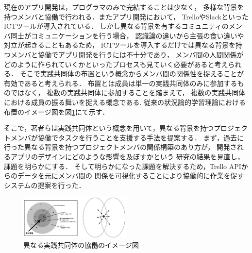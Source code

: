 
現在のアプリ開発は，プログラマのみで完結することは少なく，
多様な背景を持つメンバと協働で行われる．またアプリ開発において，
TrelloやSlackといったICTツールが導入されている．
しかし異なる背景を有するコミュニティのメンバ同士がコミュニケーションを行う場合，
認識論の違いから主張の食い違いや対立が起きることもあるため\cite{conflict}，
ICTツールを導入するだけでは異なる背景を持つメンバと協働でアプリ開発を行うには不十分であり，
メンバ間の人間関係がどのように作られていくかといったプロセスも見ていく必要があると考えられる．
そこで実践共同体\cite{Matsumoto}の布置という概念からメンバ間の関係性を捉えることが有効であると考えられる．
布置とは成員は単一の実践共同体のみに参加するものではなく，
複数の実践共同体に参加することを踏まえて，
複数の実践共同体における成員の振る舞いを捉える概念である.
従来の状況論的学習理論における布置のイメージ図を図\ref{overlap}にて示す．


そこで，著者らは実践共同体という概念を用いて，異なる背景を持つプロジェクトメンバが協働でタスクを行うことを支援する手法を提案する．
まず，過去に行った異なる背景を持つプロジェクトメンバの関係構築のあり方が，
開発されるアプリのデザインにどのような影響を及ぼすかという
研究の結果を見直し，課題を明らかにする．
そして明らかになった課題を解決するため，Trello APIからのデータを元にメンバ間の
関係を可視化することにより協働的に作業を促すシステムの提案を行った．

\begin{figure}[h]
  \centering
  \includegraphics[width=0.5\textwidth]{img/cop-overlap.eps}
  \caption{異なる実践共同体の協働のイメージ図}
  \label{overlap}
\end{figure}
